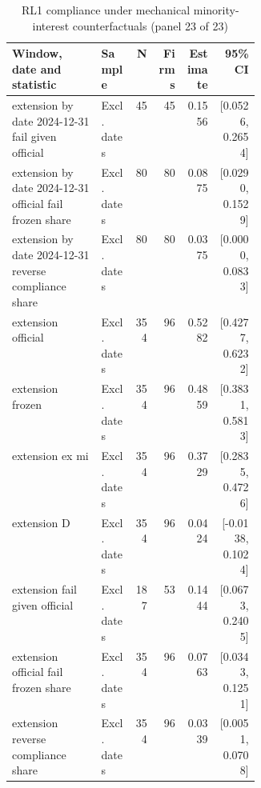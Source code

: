 \begin{table}[!htbp]\centering\scriptsize
\caption{RL1 compliance under mechanical minority-interest counterfactuals (panel 23 of 23)}
\begin{threeparttable}
\begin{tabular}{p{0.36\linewidth}lrrrr}
\toprule
Window, date and statistic & Sample & N & Firms & Estimate & 95\% CI \\
\midrule
extension by date 2024-12-31 fail given official & Excl. dates & 45 & 45 & 0.1556 & [0.0526, 0.2654] \\
extension by date 2024-12-31 official fail frozen share & Excl. dates & 80 & 80 & 0.0875 & [0.0290, 0.1529] \\
extension by date 2024-12-31 reverse compliance share & Excl. dates & 80 & 80 & 0.0375 & [0.0000, 0.0833] \\
extension  official & Excl. dates & 354 & 96 & 0.5282 & [0.4277, 0.6232] \\
extension  frozen & Excl. dates & 354 & 96 & 0.4859 & [0.3831, 0.5813] \\
extension  ex mi & Excl. dates & 354 & 96 & 0.3729 & [0.2835, 0.4726] \\
extension  D & Excl. dates & 354 & 96 & 0.0424 & [-0.0138, 0.1024] \\
extension  fail given official & Excl. dates & 187 & 53 & 0.1444 & [0.0673, 0.2405] \\
extension  official fail frozen share & Excl. dates & 354 & 96 & 0.0763 & [0.0343, 0.1251] \\
extension  reverse compliance share & Excl. dates & 354 & 96 & 0.0339 & [0.0051, 0.0708] \\
\bottomrule
\end{tabular}
\begin{tablenotes}[flushleft]\footnotesize

\end{tablenotes}
\end{threeparttable}
\end{table}
